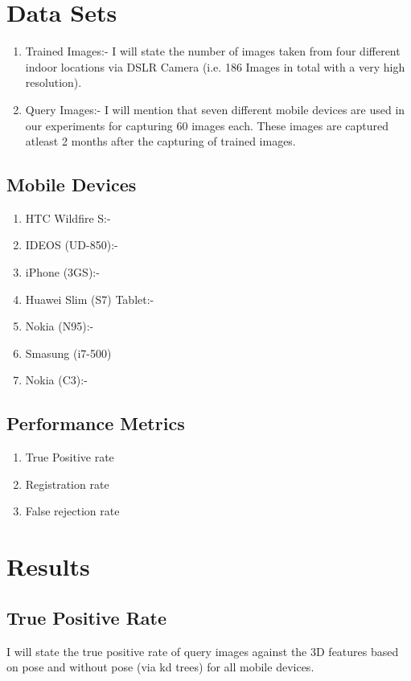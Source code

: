 \section{Data Sets}
\begin{enumerate}
\item Trained Images:-  
I will state the number of images taken from 
four different indoor locations via DSLR Camera 
(i.e. 186 Images in total with a very high resolution). 
\item Query Images:-
I will mention that seven different mobile devices 
are used in our experiments for capturing 60 images each. 
These images are captured atleast 2 months after 
the capturing of trained images. 
 
\end{enumerate}
\subsection{Mobile Devices}

\begin{enumerate}
\item HTC Wildfire S:-
\item IDEOS (UD-850):-
\item iPhone (3GS):-
\item Huawei Slim (S7) Tablet:-
\item Nokia (N95):-
\item Smasung (i7-500)
\item Nokia (C3):-
\end{enumerate}

\subsection{Performance Metrics}
\begin{enumerate}
\item True Positive rate
\item Registration rate
\item False rejection rate
\end{enumerate}
\section{Results}
\subsection{True Positive Rate}
I will state the true positive rate 
of query images against the 3D features 
based on pose and without pose (via kd trees)
for all mobile devices.


